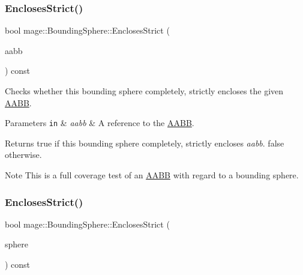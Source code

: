 \subsubsection{\texorpdfstring{Encloses\+Strict()}{EnclosesStrict()}\hspace{0.1cm}{\footnotesize\ttfamily [3/4]}}
{\footnotesize\ttfamily bool mage\+::\+Bounding\+Sphere\+::\+Encloses\+Strict (\begin{DoxyParamCaption}\item[{const \mbox{\hyperlink{classmage_1_1_a_a_b_b}{A\+A\+BB}} \&}]{aabb }\end{DoxyParamCaption}) const\hspace{0.3cm}{\ttfamily [noexcept]}}

Checks whether this bounding sphere completely, strictly encloses the given \mbox{\hyperlink{classmage_1_1_a_a_b_b}{A\+A\+BB}}.


\begin{DoxyParams}[1]{Parameters}
\mbox{\tt in}  & {\em aabb} & A reference to the \mbox{\hyperlink{classmage_1_1_a_a_b_b}{A\+A\+BB}}. \\
\hline
\end{DoxyParams}
\begin{DoxyReturn}{Returns}
{\ttfamily true} if this bounding sphere completely, strictly encloses {\itshape aabb}. {\ttfamily false} otherwise. 
\end{DoxyReturn}
\begin{DoxyNote}{Note}
This is a full coverage test of an \mbox{\hyperlink{classmage_1_1_a_a_b_b}{A\+A\+BB}} with regard to a bounding sphere. 
\end{DoxyNote}
\mbox{\label{classmage_1_1_bounding_sphere_a8f0fc134762fb9a00b47d62cc09c7703}} 
\subsubsection{\texorpdfstring{Encloses\+Strict()}{EnclosesStrict()}\hspace{0.1cm}{\footnotesize\ttfamily [4/4]}}
{\footnotesize\ttfamily bool mage\+::\+Bounding\+Sphere\+::\+Encloses\+Strict (\begin{DoxyParamCaption}\item[{const \mbox{\hyperlink{classmage_1_1_bounding_sphere}{Bounding\+Sphere}} \&}]{sphere }\end{DoxyParamCaption}) const\hspace{0.3cm}{\ttfamily [noexcept]}}

